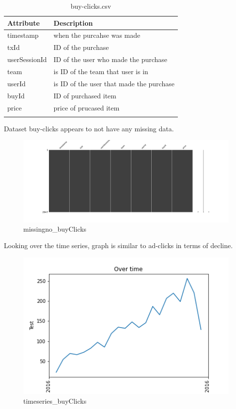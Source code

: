 \begin{center}
\begin{longtable}{ |l|l| } 
 \hline
 Attribute & Description\\ 
 \hline
 timestamp & when the purcahse was made\\ 
 \hline
 txId & ID of the purchase\\ 
 \hline
 userSessionId & ID of the user who made the purchase\\ 
 \hline
 team & is ID of the team that user is in\\ 
 \hline
 userId & is ID of the user that made the purchase\\ 
 \hline
 buyId & ID of purchased item\\ 
 \hline
 price & price of prucased item\\ 
 \hline
\caption{buy-clicks.csv}
\end{longtable}
\end{center}

Dataset buy-clicks appears to not have any missing data.
\begin{figure}[H]
\includegraphics[scale=0.25]{img/Graphs/buyClicks/missingno_buyClicks.png}
\centering
\caption{missingno\_buyClicks}
\label{fig:missingno_buyClicks}
\end{figure}

Looking over the time series, graph is similar to ad-clicks in terms of decline. 
\begin{figure}[H]
\includegraphics[scale=0.85]{img/Graphs/buyClicks/timeseries_buyClicks.png}
\centering
\caption{timeseries\_buyClicks}
\label{fig:timeseries_buyClicks}
\end{figure}

